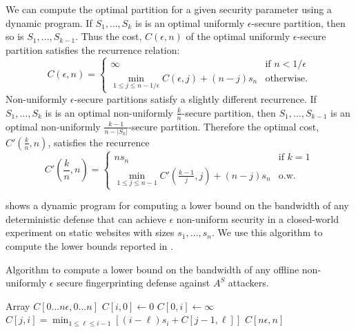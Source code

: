 \documentclass[10pt,journal]{IEEEtran}
\begin{document}
We can compute the optimal partition for a given security parameter
using a dynamic program.  If $S_1, \dots, S_k$ is is an optimal
uniformly $\epsilon$-secure partition, then so is $S_1,\dots,S_{k-1}$.
Thus the cost, $C(\epsilon, n)$ of the optimal uniformly
$\epsilon$-secure partition satisfies the recurrence relation:
\[
C(\epsilon, n)=
\left\{
\begin{array}{ll}
  \infty & \text{if $n<1/\epsilon$} \\
  \displaystyle\min_{1\leq j\leq n-1/\epsilon}C(\epsilon, j)+(n-j)s_n & \text{otherwise.}
\end{array}\right.
\]
Non-uniformly $\epsilon$-secure partitions satisfy a slightly
different recurrence.  If $S_1, \dots, S_k$ is is an optimal
non-uniformly $\frac{k}{n}$-secure partition, then $S_1,\dots,S_{k-1}$
is an optimal non-uniformly $\frac{k-1}{n-|S_k|}$-secure partition.
Therefore the optimal cost, $C'(\frac{k}{n},n)$, satisfies the
recurrence
\[
C'(\frac{k}{n}, n)=
\left\{
\begin{array}{ll}
  ns_n & \text{if $k=1$} \\
  \displaystyle\min_{1\leq j\leq n-1}C'(\frac{k-1}{j}, j)+(n-j)s_n & \text{o.w.}
\end{array}\right.
\]

 shows a dynamic program for computing a lower bound on
the bandwidth of any deterministic defense that can achieve $\epsilon$
non-uniform security in a closed-world experiment on static websites
with sizes $s_1,\dots,s_n$.  We use this algorithm to compute the
lower bounds reported in .

\begin{algorithm}[t]
  \caption{Algorithm to compute a lower bound on the bandwidth of any offline non-uniformly $\epsilon$ secure fingerprinting defense against $A^{S}$ attackers.}
  \label{alg:dp}
  \begin{algorithmic}
     \State Array $C[0 \dots n\epsilon,0 \dots n]$
	    \State $C[i, 0] \gets 0$
    \EndFor
      \State $C[0, i] \gets \infty$
    \EndFor
        \State $C[j, i] = \min_{1\leq \ell \leq i-1} \left[(i-\ell) s_{i} + C[j-1, \ell]\right]$
	    \EndFor
	  \EndFor
	  \State \Return $C[n\epsilon, n]$
    \EndFunction
  \end{algorithmic}
\end{algorithm}
\end{document}
